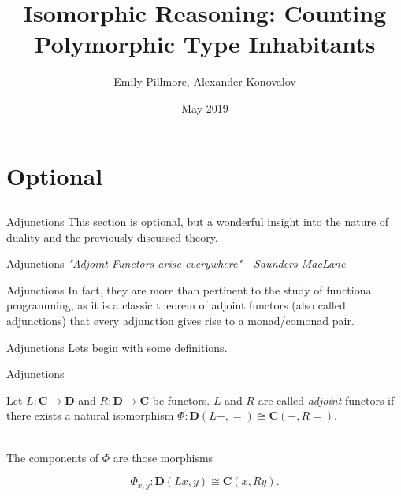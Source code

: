 \documentclass[tikz]{beamer}
\title{Isomorphic Reasoning: Counting Polymorphic Type Inhabitants}
\author{Emily Pillmore, Alexander Konovalov}
\date{May 2019}
\theoremstyle{definition}
\newcommand{\cat}[1]{\mathbf{#1}}
\begin{document}
\section{Optional}
\subsection{}

\begin{frame}{Adjunctions}
    This section is optional, but a wonderful insight into the nature of duality and the previously discussed theory. 
\end{frame}

\begin{frame}{Adjunctions}
    \textit{"Adjoint Functors arise everywhere" - Saunders MacLane} 
\end{frame}

\begin{frame}{Adjunctions}
    In fact, they are more than pertinent to the study of functional programming, as it is a classic theorem of adjoint functors (also called adjunctions) that every adjunction gives rise to a monad/comonad pair. 
\end{frame}

\begin{frame}{Adjunctions}
    Lets begin with some definitions. 
\end{frame}

\begin{frame}{Adjunctions}
   
   \begin{definition}[Adjunction]
        Let $L: \cat{C} \to \cat{D}$ and $R : \cat{D} \to \cat{C}$ be functors. $L$ and $R$ are called \textit{adjoint} functors if
        there exists a natural isomorphism $\Phi : \cat{D}(L-, =) \cong \cat{C}(-, R=)$. 
   \end{definition}{} 
\\  
The components of $\Phi$ are those morphisms 

\begin{equation*}
    \Phi_{x,y}: \cat{D}(Lx, y) \cong \cat{C}(x, Ry).
\end{equation*}
\end{frame}{}
\end{document}
